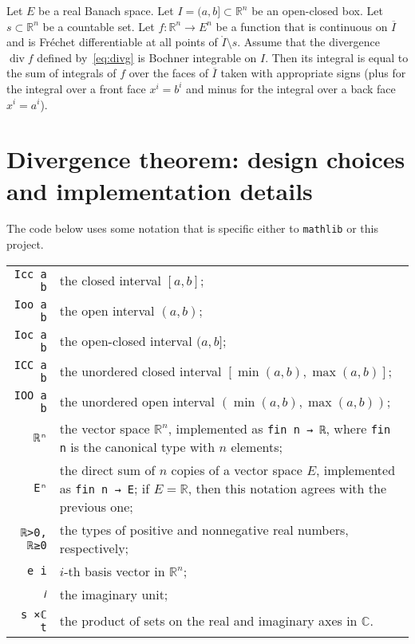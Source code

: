 \documentclass[a4paper, UKenglish,cleveref, autoref, thm-restate]{lipics-v2021}
\newcommand{\bbR}{\mathbb{R}}
\newcommand{\bbC}{\mathbb{C}}
\DeclareMathOperator{\divg}{div}
\begin{document}
\begin{theorem}%
  \label{thm:divergence-Bochner}
  Let \(E\) be a real Banach space. Let \(I=(a,b]\subset\bbR^{n}\) be
  an open-closed box. Let \(s \subset\bbR^{n}\) be a countable
  set. Let \(f\colon \bbR^{n}\to E^{n}\) be a function that is
  continuous on \(\overline I\) and is Fréchet differentiable at all
  points of \(\mathring I \setminus s\). Assume that the divergence
  \(\divg f\) defined by~\eqref{eq:divg} is Bochner integrable on
  \(I\). Then its integral is equal to the sum of integrals of \(f\)
  over the faces of \(\overline I\) taken with appropriate signs (plus
  for the integral over a front face \(x^{i}=b^{i}\) and minus for the
  integral over a back face \(x^{i}=a^{i}\)).
\end{theorem}

\section{Divergence theorem: design choices and implementation details}%
\label{sec:GP-impl}
The code below uses some notation that is specific either to
\texttt{mathlib} or this project.

\noindent
\begin{tabular}{rp{12cm}}
  \lstinline=Icc a b=& the closed interval \([a, b]\);\\
  \lstinline=Ioo a b=& the open interval \((a, b)\);\\
  \lstinline=Ioc a b=& the open-closed interval \((a, b]\);\\
  \lstinline=ICC a b=& the unordered closed interval \([\min(a, b), \max(a, b)]\);\\
  \lstinline=IOO a b=& the unordered open interval \((\min(a, b), \max(a, b))\);\\
  \lstinline=ℝⁿ=& the vector space \(\bbR^{n}\), implemented as \lstinline=fin n → ℝ=,
                  where \lstinline+fin n+ is the canonical type with \(n\) elements;\\
  \lstinline=Eⁿ=& the direct sum of \(n\) copies of a vector space \(E\), implemented as \lstinline=fin n → E=;
                  if \(E=\bbR\), then this notation agrees with the previous one;\\
  \lstinline=ℝ>0, ℝ≥0=& the types of positive and nonnegative real numbers, respectively;\\
  \lstinline=e i=& \(i\)-th basis vector in \(\bbR^{n}\);\\
  \lstinline=𝑖=& the imaginary unit;\\
  \lstinline=s ×ℂ t=& the product of sets on the real and imaginary axes in \(\bbC\).
\end{tabular}
\end{document}
